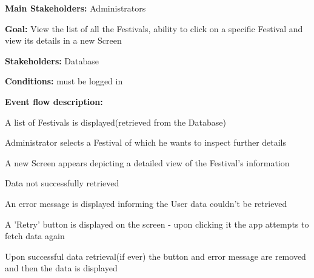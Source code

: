 				\noindent {}
				\begin{packed_item}
					\item \textbf{Main Stakeholders:} Administrators
					\item \textbf{Goal:} View the list of all the Festivals, ability to click on a specific Festival and view its details in a new Screen
					\item \textbf{Stakeholders:} Database
					\item \textbf{Conditions:} must be logged in
					\item \textbf{Event flow description: }
					\begin{packed_enum}
						\item A list of Festivals is displayed(retrieved from the Database)
						\item Administrator selects a Festival of which he wants to inspect further details
						\item A new Screen appears depicting a detailed view of the Festival's information
					\end{packed_enum}
				
					\begin{packed_item}
						\item[1.a] Data not successfully retrieved
						\item[] \begin{packed_enum}
							\item An error message is displayed informing the User data couldn't be retrieved
							\item A 'Retry' button is displayed on the screen - upon clicking it the app attempts to fetch data again
							\item Upon successful data retrieval(if ever) the button and error message are removed and then the data is displayed
						\end{packed_enum}
					\end{packed_item}
					
				\end{packed_item}
					
